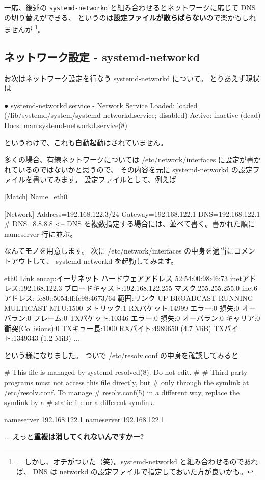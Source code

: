 \documentclass[mingoth,a4paper]{jsarticle}
\begin{document}
一応、後述の \verb|systemd-networkd| と組み合わせるとネットワークに応じて DNS の切り替えができる、
というのは\textbf{設定ファイルが散らばらない}ので楽かもしれませんが%
\footnote{
$\dots$ しかし、オチがついた（笑）。systemd-networkd と組み合わせるのであれば、
DNS は networkd の設定ファイルで指定しておいた方が良いかも。
}。

\subsection{ネットワーク設定 - systemd-networkd}

お次はネットワーク設定を行なう systemd-networkd について。
とりあえず現状は
\begin{commandline}
● systemd-networkd.service - Network Service
   Loaded: loaded (/lib/systemd/system/systemd-networkd.service; disabled)
   Active: inactive (dead)
     Docs: man:systemd-networkd.service(8)
\end{commandline}
\noindent
というわけで、これも自動起動はされていません。

多くの場合、有線ネットワークについては
/etc/network/interfaces に設定が書かれているのではないかと思うので、
その内容を元に systemd-networkd の設定ファイルを書いてみます。
設定ファイルとして、例えば
\begin{commandline}
[Match]
Name=eth0

[Network]
Address=192.168.122.3/24
Gateway=192.168.122.1
DNS=192.168.122.1
# DNS=8.8.8.8     <-- DNS を複数指定する場合には、並べて書く。書かれた順に nameserver 行に並ぶ。
\end{commandline}
\noindent
なんてモノを用意します。
次に /etc/network/interfaces の中身を適当にコメントアウトして、
systemd-networkd を起動してみます。
\begin{commandline}
eth0      Link encap:イーサネット  ハードウェアアドレス 52:54:00:98:46:73
          inetアドレス:192.168.122.3 ブロードキャスト:192.168.122.255  マスク:255.255.255.0
          inet6アドレス: fe80::5054:ff:fe98:4673/64 範囲:リンク
          UP BROADCAST RUNNING MULTICAST  MTU:1500  メトリック:1
          RXパケット:14999 エラー:0 損失:0 オーバラン:0 フレーム:0
          TXパケット:10346 エラー:0 損失:0 オーバラン:0 キャリア:0
      衝突(Collisions):0 TXキュー長:1000
          RXバイト:4989650 (4.7 MiB)  TXバイト:1349343 (1.2 MiB)
...
\end{commandline}
という様になりました。
%
ついで /etc/resolv.conf の中身を確認してみると
\begin{commandline}
# This file is managed by systemd-resolved(8). Do not edit.
#
# Third party programs must not access this file directly, but
# only through the symlink at /etc/resolv.conf. To manage
# resolv.conf(5) in a different way, replace the symlink by a
# static file or a different symlink.

nameserver 192.168.122.1
nameserver 192.168.122.1
\end{commandline}
\noindent
$\dots$ えっと\textbf{重複は消してくれないんですかー?}
\end{document}
